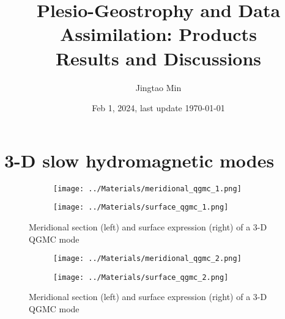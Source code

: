 \documentclass[a4paper, 11pt]{report}
\title{Plesio-Geostrophy and Data Assimilation: Products \\ {\Large Results and Discussions}}
\author{Jingtao Min}
\date{Feb 1, 2024, last update \today}
\begin{document}
\maketitle



\appendix

\chapter{3-D slow hydromagnetic modes}

\begin{figure}[htbp]
    \centering
    \begin{subfigure}[c]{0.49\linewidth}
        \texttt{[image: ../Materials/meridional\_qgmc\_1.png]}
    \end{subfigure}
    \begin{subfigure}[c]{0.49\linewidth}
        \texttt{[image: ../Materials/surface\_qgmc\_1.png]}
    \end{subfigure}
    \caption{Meridional section (left) and surface expression (right) of a 3-D QGMC mode}
\end{figure}

\begin{figure}[htbp]
    \centering
    \begin{subfigure}[c]{0.49\linewidth}
        \texttt{[image: ../Materials/meridional\_qgmc\_2.png]}
    \end{subfigure}
    \begin{subfigure}[c]{0.49\linewidth}
        \texttt{[image: ../Materials/surface\_qgmc\_2.png]}
    \end{subfigure}
    \caption{Meridional section (left) and surface expression (right) of a 3-D QGMC mode}
\end{figure}


\printbibliography
\end{document}
